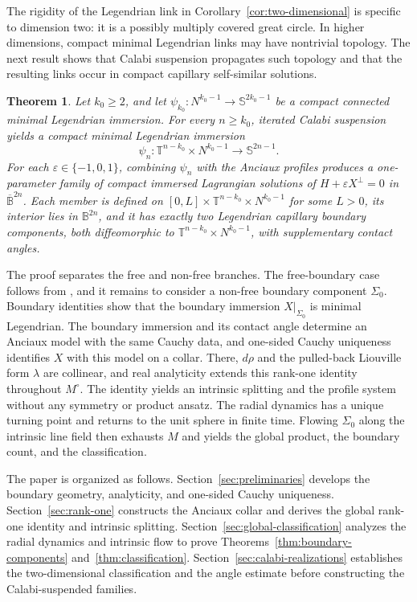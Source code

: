 \documentclass[11pt,a4paper]{article}
\numberwithin{equation}{section}
\newtheorem{theorem}{Theorem}[section]
\newcommand{\B}{\mathbb B}
\newcommand{\Sph}{\mathbb S}
\begin{document}
The rigidity of the Legendrian link in
Corollary~\ref{cor:two-dimensional} is specific to dimension two: it is a
possibly multiply covered great circle.  In higher dimensions, compact
minimal Legendrian links may have nontrivial topology.  The next result
shows that Calabi suspension propagates such topology and that the resulting
links occur in compact capillary self-similar solutions.

\begin{theorem}
\label{thm:intro-calabi-realization}
Let $k_0\ge2$, and let
$\psi_{k_0}:N^{k_0-1}\to\Sph^{2k_0-1}$ be a compact connected minimal
Legendrian immersion.  For every $n\ge k_0$, iterated Calabi suspension
yields a compact minimal Legendrian immersion
\[
        \psi_n:\mathbb T^{n-k_0}\times N^{k_0-1}
        \longrightarrow\Sph^{2n-1}.
\]
For each $\varepsilon\in\{-1,0,1\}$, combining $\psi_n$ with the Anciaux
profiles produces a one-parameter family of compact immersed Lagrangian
solutions of $H+\varepsilon X^\perp=0$ in $\overline{\B}^{2n}$.  Each member
is defined on
$[0,L]\times\mathbb T^{n-k_0}\times N^{k_0-1}$ for some $L>0$, its interior
lies in $\B^{2n}$, and it has exactly two Legendrian capillary boundary
components, both diffeomorphic to
$\mathbb T^{n-k_0}\times N^{k_0-1}$, with supplementary contact angles.
\end{theorem}

The proof separates the free and non-free branches.  The free-boundary
case follows from \cite[Theorem~1.3]{GaoMaYao2026}, and it remains to
consider a non-free boundary component $\Sigma_0$.  Boundary identities
show that the boundary immersion $X|_{\Sigma_0}$ is minimal Legendrian.
The boundary immersion and its contact angle determine an Anciaux model
with the same Cauchy data, and one-sided Cauchy uniqueness identifies $X$
with this model on a collar.  There, $d\rho$ and the pulled-back Liouville
form $\lambda$ are collinear, and real analyticity extends this rank-one
identity throughout $M^\circ$.  The identity yields an intrinsic splitting
and the profile system without any symmetry or product ansatz.  The radial
dynamics has a unique turning point and returns to the unit sphere in finite
time.  Flowing $\Sigma_0$ along the intrinsic line field then exhausts $M$
and yields the global product, the boundary count, and the classification.

\vspace{0.2cm}

The paper is organized as follows.
Section~\ref{sec:preliminaries} develops the boundary geometry,
analyticity, and one-sided Cauchy uniqueness.
Section~\ref{sec:rank-one} constructs the Anciaux collar and derives the
global rank-one identity and intrinsic splitting.
Section~\ref{sec:global-classification} analyzes the radial dynamics and
intrinsic flow to prove Theorems~\ref{thm:boundary-components}
and~\ref{thm:classification}.
Section~\ref{sec:calabi-realizations} establishes the two-dimensional
classification and the angle estimate before constructing the Calabi-suspended families.
\end{document}
